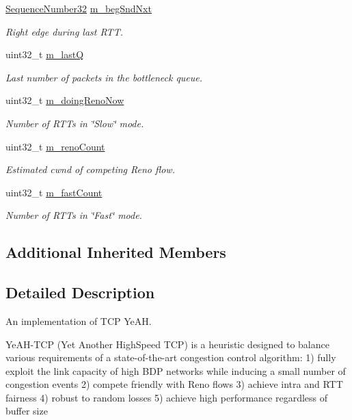 \begin{DoxyCompactItemize}
\hyperlink{group__network_gacb2070e4e98d2d5135c9bede58f07a03}{Sequence\+Number32} \hyperlink{classns3_1_1TcpYeah_a8e8f91c5e0b2706f00c89d76563e83fb}{m\+\_\+beg\+Snd\+Nxt}
\begin{DoxyCompactList}\small\item\em Right edge during last R\+TT. \end{DoxyCompactList}\item 
uint32\+\_\+t \hyperlink{classns3_1_1TcpYeah_a6bea8f785d16df35d447ba70b4464fb9}{m\+\_\+lastQ}
\begin{DoxyCompactList}\small\item\em Last number of packets in the bottleneck queue. \end{DoxyCompactList}\item 
uint32\+\_\+t \hyperlink{classns3_1_1TcpYeah_ad70d5e4310bd47c13bdfe5a665a4a911}{m\+\_\+doing\+Reno\+Now}
\begin{DoxyCompactList}\small\item\em Number of R\+T\+Ts in \char`\"{}\+Slow\char`\"{} mode. \end{DoxyCompactList}\item 
uint32\+\_\+t \hyperlink{classns3_1_1TcpYeah_a23724f2976fedf0c221ebad49a54487c}{m\+\_\+reno\+Count}
\begin{DoxyCompactList}\small\item\em Estimated cwnd of competing Reno flow. \end{DoxyCompactList}\item 
uint32\+\_\+t \hyperlink{classns3_1_1TcpYeah_adec63c13d5f8b6677008aa5209437483}{m\+\_\+fast\+Count}
\begin{DoxyCompactList}\small\item\em Number of R\+T\+Ts in \char`\"{}\+Fast\char`\"{} mode. \end{DoxyCompactList}\end{DoxyCompactItemize}
\subsection*{Additional Inherited Members}


\subsection{Detailed Description}
An implementation of T\+CP Ye\+AH. 

Ye\+A\+H-\/\+T\+CP (Yet Another High\+Speed T\+CP) is a heuristic designed to balance various requirements of a state-\/of-\/the-\/art congestion control algorithm\+: 1) fully exploit the link capacity of high B\+DP networks while inducing a small number of congestion events 2) compete friendly with Reno flows 3) achieve intra and R\+TT fairness 4) robust to random losses 5) achieve high performance regardless of buffer size

